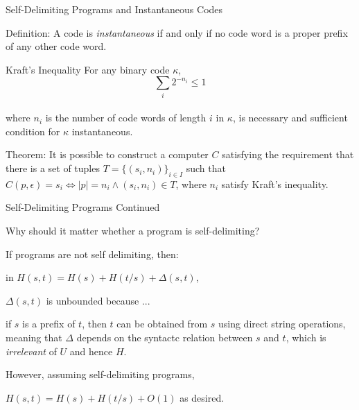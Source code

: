 \documentclass{beamer}
\begin{document}
\begin{frame}{Self-Delimiting Programs and Instantaneous Codes}

\begin{structure}{Definition:}
 A code is \emph{instantaneous} if and only if no code word is a proper prefix
 of any other code word.
\end{structure}

\medskip

\begin{structure}{Kraft's Inequality}
 For any binary code $\kappa$,
  \[\sum_i 2^{-n_i} \le 1 \]\\
 where $n_i$ is the number of code words of length $i$ in $\kappa$,
 is necessary and sufficient condition for $\kappa$ instantaneous.

\end{structure}

\begin{structure}{Theorem:}
 It is possible to construct a computer $C$ satisfying the
 requirement that there is a set of tuples $T = \{ (s_i, n_i) \}_{i \in I}$
 such that $C(p, \epsilon) = s_i \iff \vert p \vert = n_i
 \land (s_i, n_i) \in T$, where $n_i$ satisfy Kraft's inequality.
\end{structure}

\end{frame}

\begin{frame}{Self-Delimiting Programs Continued}

Why should it matter whether a program is self-delimiting?

\bigskip

\begin{structure}{If programs are not self delimiting, then:}

 in $H(s, t) = H(s) + H(t/s) + \Delta(s, t)$,
 \color{red}{$\Delta(s,t)$ is not bounded!}
 
\end{structure}

\medskip

\begin{structure}{$\Delta(s, t)$ is unbounded because ...}

 if $s$ is a prefix of $t$, then $t$ can be obtained from $s$ using direct
 string operations, meaning that $\Delta$ depends on the syntactc relation
 between $s$ and $t$, which is \emph{irrelevant} of $U$ and hence $H$.

\end{structure}

\medskip

\begin{structure}{However, assuming self-delimiting programs,}

 $H(s, t) = H(s) + H(t/s) + O(1)$ as desired.

\end{structure}

\end{frame}
\end{document}
